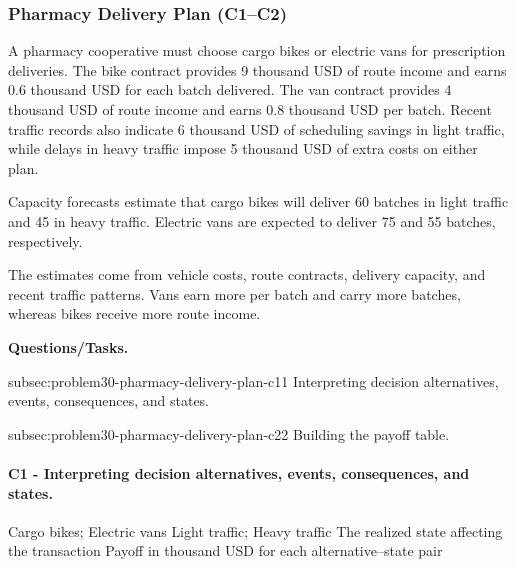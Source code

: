 	\subsubsection{Pharmacy Delivery Plan (C1--C2)}
	\label{sec:problem30-pharmacy-delivery-plan-c1-c2}
	
	A pharmacy cooperative must choose cargo bikes or electric vans for prescription deliveries. The bike contract provides 9 thousand USD of route income and earns 0.6 thousand USD for each batch delivered. The van contract provides 4 thousand USD of route income and earns 0.8 thousand USD per batch. Recent traffic records also indicate 6 thousand USD of scheduling savings in light traffic, while delays in heavy traffic impose 5 thousand USD of extra costs on either plan.
	
	Capacity forecasts estimate that cargo bikes will deliver 60 batches in light traffic and 45 in heavy traffic. Electric vans are expected to deliver 75 and 55 batches, respectively.
	
	The estimates come from vehicle costs, route contracts, delivery capacity, and recent traffic patterns. Vans earn more per batch and carry more batches, whereas bikes receive more route income.

	\textbf{Questions/Tasks.}
	\begin{enumerate}
	\CriterionTask
	{subsec:problem30-pharmacy-delivery-plan-c1}{1}
	{Interpreting decision alternatives, events, consequences, and states.}

	\CriterionTask
	{subsec:problem30-pharmacy-delivery-plan-c2}{2}
	{Building the payoff table.}
	\end{enumerate}

\paragraph*{C1 - Interpreting decision alternatives, events, consequences, and states.}
	\label{subsec:problem30-pharmacy-delivery-plan-c1}
	\DecisionElementsTable
	{Cargo bikes; Electric vans}
	{Light traffic; Heavy traffic}
	{The realized state affecting the transaction}
	{Payoff in thousand USD for each alternative--state pair}

